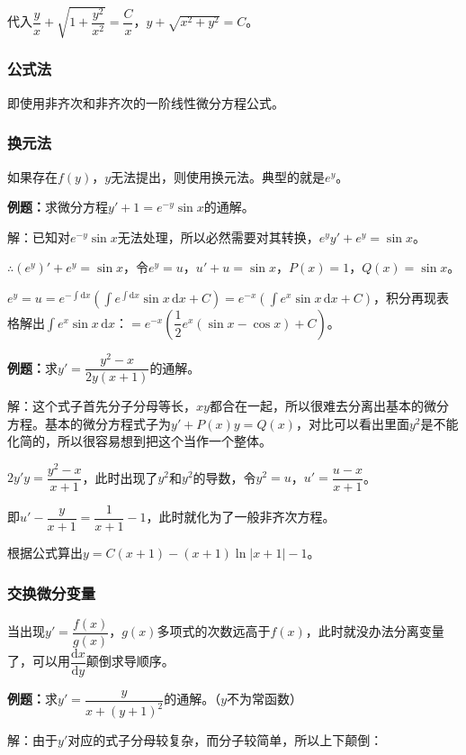 代入$\dfrac{y}{x}+\sqrt{1+\dfrac{y^2}{x^2}}=\dfrac{C}{x}$，$y+\sqrt{x^2+y^2}=C$。

\subsubsection{公式法}

即使用非齐次和非齐次的一阶线性微分方程公式。

\subsubsection{换元法}

如果存在$f(y)$，$y$无法提出，则使用换元法。典型的就是$e^y$。

\textbf{例题：}求微分方程$y'+1=e^{-y}\sin x$的通解。

解：已知对$e^{-y}\sin x$无法处理，所以必然需要对其转换，$e^yy'+e^y=\sin x$。

$\therefore(e^y)'+e^y=\sin x$，令$e^y=u$，$u'+u=\sin x$，$P(x)=1$，$Q(x)=\sin x$。

$e^y=u=e^{-\int\textrm{d}x}(\int e^{\int\textrm{d}x}\sin x\,\textrm{d}x+C)=e^{-x}(\int e^x\sin x\,\textrm{d}x+C)$，积分再现表格解出$\int e^x\sin x\,\textrm{d}x$：$=e^{-x}\left(\dfrac{1}{2}e^x(\sin x-\cos x)+C\right)$。

\textbf{例题：}求$y'=\dfrac{y^2-x}{2y(x+1)}$的通解。

解：这个式子首先分子分母等长，$xy$都合在一起，所以很难去分离出基本的微分方程。基本的微分方程式子为$y'+P(x)y=Q(x)$，对比可以看出里面$y^2$是不能化简的，所以很容易想到把这个当作一个整体。

$2y'y=\dfrac{y^2-x}{x+1}$，此时出现了$y^2$和$y^2$的导数，令$y^2=u$，$u'=\dfrac{u-x}{x+1}$。

即$u'-\dfrac{y}{x+1}=\dfrac{1}{x+1}-1$，此时就化为了一般非齐次方程。

根据公式算出$y=C(x+1)-(x+1)\ln\vert x+1\vert-1$。

\subsubsection{交换微分变量}

当出现$y'=\dfrac{f(x)}{g(x)}$，$g(x)$多项式的次数远高于$f(x)$，此时就没办法分离变量了，可以用$\dfrac{\textrm{d}x}{\textrm{d}y}$颠倒求导顺序。

\textbf{例题：}求$y'=\dfrac{y}{x+(y+1)^2}$的通解。（$y$不为常函数）

解：由于$y'$对应的式子分母较复杂，而分子较简单，所以上下颠倒：

